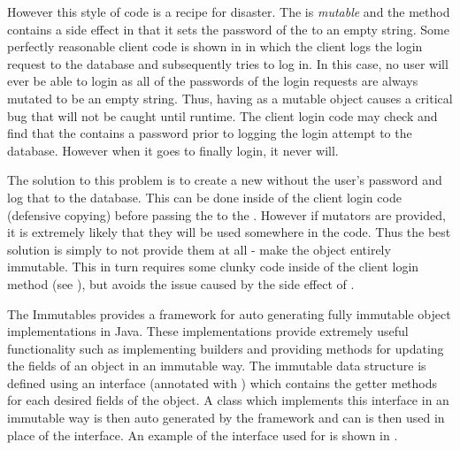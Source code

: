



However this style of code is a recipe for disaster. The  is \textit{mutable} and the  method contains a side effect in that it sets the password of the  to an empty string. Some perfectly reasonable client code is shown in  in which the client logs the login request to the database and subsequently tries to log in. In this case, no user will ever be able to login as all of the passwords of the login requests are always mutated to be an empty string. Thus, having  as a mutable object causes a critical bug that will not be caught until runtime. The client login code may check and find that the  contains a password prior to logging the login attempt to the database. However when it goes to finally login, it never will.



The solution to this problem is to create a new  without the user's password and log that to the database. This can be done inside of the client login code (defensive copying) before passing the  to the . However if mutators are provided, it is extremely likely that they will be used somewhere in the code. Thus the best solution is simply to not provide them at all - make the object entirely immutable. This in turn requires some clunky code inside of the client login method (see ), but avoids the issue caused by the side effect of . 



The Immutables \cite{immutablesJava} provides a framework for auto generating fully immutable object implementations in Java. These implementations provide extremely useful functionality such as implementing builders and providing methods for updating the fields of an object in an immutable way. The immutable data structure is defined using an interface (annotated with ) which contains the getter methods for each desired fields of the object. A class which implements this interface in an immutable way is then auto generated by the framework and can is then used in place of the interface. An example of the interface used for  is shown in .

